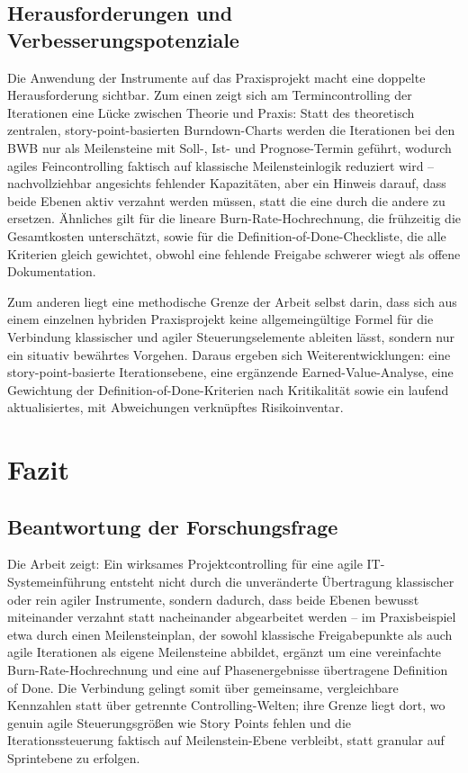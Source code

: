 \documentclass[
    12pt, 
    a4paper,
    ]{scrartcl} %
\begin{document}
\subsection{Herausforderungen und Verbesserungspotenziale}

Die Anwendung der Instrumente auf das Praxisprojekt macht eine doppelte Herausforderung sichtbar. Zum einen zeigt sich am Termincontrolling der Iterationen eine Lücke zwischen Theorie und Praxis: Statt des theoretisch zentralen, story-point-basierten Burndown-Charts werden die Iterationen bei den BWB nur als Meilensteine mit Soll-, Ist- und Prognose-Termin geführt, wodurch agiles Feincontrolling faktisch auf klassische Meilensteinlogik reduziert wird -- nachvollziehbar angesichts fehlender Kapazitäten, aber ein Hinweis darauf, dass beide Ebenen aktiv verzahnt werden müssen, statt die eine durch die andere zu ersetzen. Ähnliches gilt für die lineare Burn-Rate-Hochrechnung, die frühzeitig die Gesamtkosten unterschätzt, sowie für die Definition-of-Done-Checkliste, die alle Kriterien gleich gewichtet, obwohl eine fehlende Freigabe schwerer wiegt als offene Dokumentation. 

Zum anderen liegt eine methodische Grenze der Arbeit selbst darin, dass sich aus einem einzelnen hybriden Praxisprojekt keine allgemeingültige Formel für die Verbindung klassischer und agiler Steuerungselemente ableiten lässt, sondern nur ein situativ bewährtes Vorgehen. Daraus ergeben sich Weiterentwicklungen: eine story-point-basierte Iterationsebene, eine ergänzende Earned-Value-Analyse, eine Gewichtung der Definition-of-Done-Kriterien nach Kritikalität sowie ein laufend aktualisiertes, mit Abweichungen verknüpftes Risikoinventar.

\section{Fazit}

\subsection{Beantwortung der Forschungsfrage}

Die Arbeit zeigt: Ein wirksames Projektcontrolling für eine agile IT-Systemeinführung entsteht nicht durch die unveränderte Übertragung klassischer oder rein agiler Instrumente, sondern dadurch, dass beide Ebenen bewusst miteinander verzahnt statt nacheinander abgearbeitet werden -- im Praxisbeispiel etwa durch einen Meilensteinplan, der sowohl klassische Freigabepunkte als auch agile Iterationen als eigene Meilensteine abbildet, ergänzt um eine vereinfachte Burn-Rate-Hochrechnung und eine auf Phasenergebnisse übertragene Definition of Done. Die Verbindung gelingt somit über gemeinsame, vergleichbare Kennzahlen statt über getrennte Controlling-Welten; ihre Grenze liegt dort, wo genuin agile Steuerungsgrößen wie Story Points fehlen und die Iterationssteuerung faktisch auf Meilenstein-Ebene verbleibt, statt granular auf Sprintebene zu erfolgen.
\end{document}
